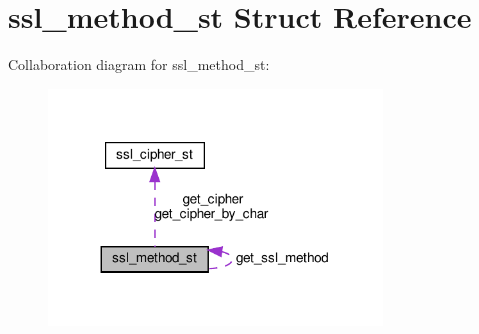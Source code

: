 \hypertarget{structssl__method__st}{}\section{ssl\+\_\+method\+\_\+st Struct Reference}
\label{structssl__method__st}


Collaboration diagram for ssl\+\_\+method\+\_\+st\+:
\nopagebreak
\begin{figure}[H]
\begin{center}
\leavevmode
\includegraphics[width=251pt]{structssl__method__st__coll__graph}
\end{center}
\end{figure}
